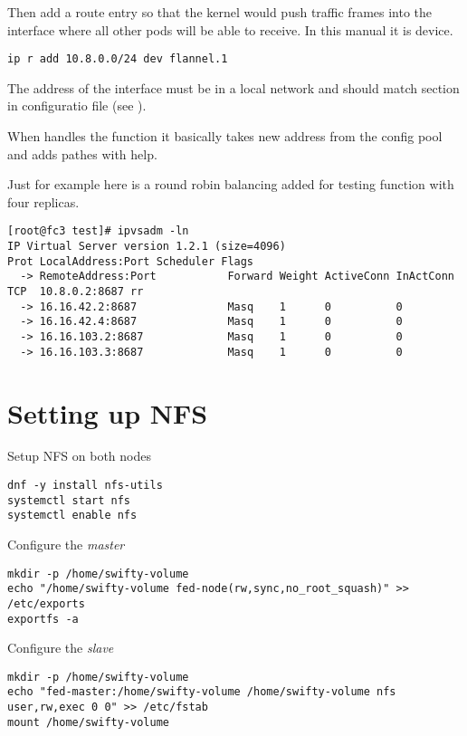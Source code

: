 Then add a route entry so that the kernel would push traffic
frames into the interface where all other pods will be able
to receive. In this manual it is  device.

\begin{lstlisting}
ip r add 10.8.0.0/24 dev flannel.1
\end{lstlisting}

The address of the interface must be in a local network and
should match  section in configuratio file
(see ).

When  handles the function it basically takes new
address from the config pool and adds pathes with 
help.

Just for example here is a round robin balancing added for
testing function with four replicas.

\begin{lstlisting}
[root@fc3 test]# ipvsadm -ln
IP Virtual Server version 1.2.1 (size=4096)
Prot LocalAddress:Port Scheduler Flags
  -> RemoteAddress:Port           Forward Weight ActiveConn InActConn
TCP  10.8.0.2:8687 rr
  -> 16.16.42.2:8687              Masq    1      0          0         
  -> 16.16.42.4:8687              Masq    1      0          0         
  -> 16.16.103.2:8687             Masq    1      0          0         
  -> 16.16.103.3:8687             Masq    1      0          0         
\end{lstlisting}

\section{Setting up NFS}
\label{sec:setup-nfs}

Setup NFS on both nodes

\begin{lstlisting}
dnf -y install nfs-utils
systemctl start nfs
systemctl enable nfs
\end{lstlisting}

Configure the \emph{master}

\begin{lstlisting}
mkdir -p /home/swifty-volume
echo "/home/swifty-volume fed-node(rw,sync,no_root_squash)" >> /etc/exports
exportfs -a
\end{lstlisting}

Configure the \emph{slave}

\begin{lstlisting}
mkdir -p /home/swifty-volume
echo "fed-master:/home/swifty-volume /home/swifty-volume nfs user,rw,exec 0 0" >> /etc/fstab
mount /home/swifty-volume
\end{lstlisting}

